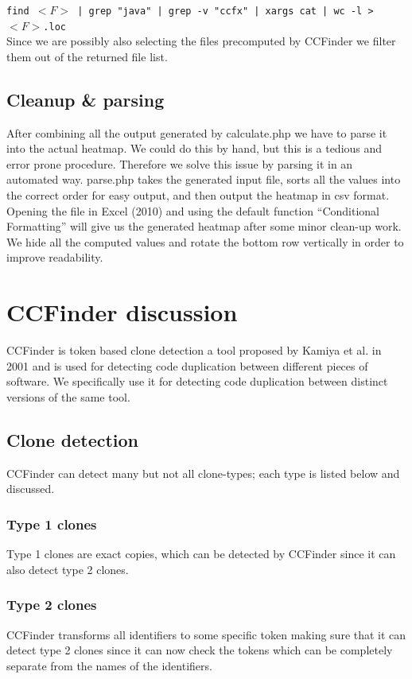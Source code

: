 \documentclass[a4paper,twoside,11pt]{article}
\begin{document}
\noindent\texttt{find $<F>$ | grep "\.java" | grep -v "ccfx" | xargs cat | wc -l > $<F>$.loc} \\

Since we are possibly also selecting the files precomputed by {\sc CCFinder} we filter them out of the returned file list.

\subsection{Cleanup \& parsing}
After combining all the output generated by {\sc calculate.php} we have to parse it into the actual heatmap. We could do this by hand, but this is a tedious and error prone procedure. Therefore we solve this issue by parsing it in an automated way. {\sc parse.php} takes the generated input file, sorts all the values into the correct order for easy output, and then output the heatmap in csv format. Opening the file in {\sc Excel} (2010) and using the default function ``Conditional Formatting'' will give us the generated heatmap after some minor clean-up work. We hide all the computed values and rotate the bottom row vertically in order to improve readability.



\section{CCFinder discussion}
\label{sec:ccfinderdiscussion}
CCFinder is token based clone detection a tool proposed by Kamiya et al.\cite{pap:ccfinder} in 2001 and is used for detecting code duplication between different pieces of software. We specifically use it for detecting code duplication between distinct versions of the same tool. 


\subsection{Clone detection}
\label{sec:cloneDetection}
CCFinder can detect many but not all clone-types; each type is listed below and discussed.

\subsubsection{Type 1 clones}
\label{sec:type1}
Type 1 clones are exact copies, which can be detected by CCFinder since it can also detect type 2 clones.

\subsubsection{Type 2 clones}
\label{sec:type2}
CCFinder transforms all identifiers to some specific token making sure that it can detect type 2 clones since it can now check the tokens which can be completely separate from the names of the identifiers.
\end{document}

